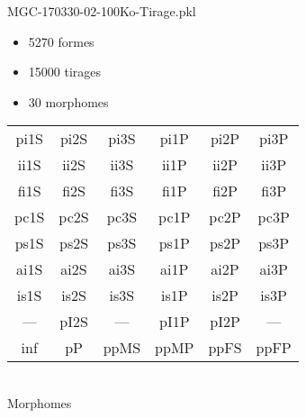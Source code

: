 MGC-170330-02-100Ko-Tirage.pkl
\begin{itemize}
\item 5270 formes
\item 15000 tirages
\item 30 morphomes
\end{itemize}
\begin{center}
\begin{tabular}{cccccc}
\hline
\cellcolor{white}pi1S & \cellcolor{white}pi2S & \cellcolor{white}pi3S & \cellcolor{white}pi1P & \cellcolor{white}pi2P & \cellcolor{white}pi3P\\
\cellcolor{brown}ii1S & \cellcolor{brown}ii2S & \cellcolor{brown}ii3S & \cellcolor{white}ii1P & \cellcolor{white}ii2P & \cellcolor{brown}ii3P\\
\cellcolor{yellow}fi1S & \cellcolor{lime}fi2S & \cellcolor{lime}fi3S & \cellcolor{green}fi1P & \cellcolor{white}fi2P & \cellcolor{white}fi3P\\
\cellcolor{yellow}pc1S & \cellcolor{yellow}pc2S & \cellcolor{yellow}pc3S & \cellcolor{green}pc1P & \cellcolor{blue}pc2P & \cellcolor{yellow}pc3P\\
\cellcolor{teal}ps1S & \cellcolor{white}ps2S & \cellcolor{teal}ps3S & \cellcolor{white}ps1P & \cellcolor{white}ps2P & \cellcolor{teal}ps3P\\
\cellcolor{white}ai1S & \cellcolor{lightgray}ai2S & \cellcolor{lightgray}ai3S & \cellcolor{blue}ai1P & \cellcolor{black}ai2P & \cellcolor{white}ai3P\\
\cellcolor{black}is1S & \cellcolor{black}is2S & \cellcolor{lightgray}is3S & \cellcolor{black}is1P & \cellcolor{black}is2P & \cellcolor{pink}is3P\\
--- & \cellcolor{white}pI2S & --- & \cellcolor{white}pI1P & \cellcolor{white}pI2P & ---\\
\cellcolor{white}inf & \cellcolor{white}pP & \cellcolor{white}ppMS & \cellcolor{white}ppMP & \cellcolor{pink}ppFS & \cellcolor{pink}ppFP\\
\hline
\end{tabular}\\
Morphomes
\end{center}
\bigskip

